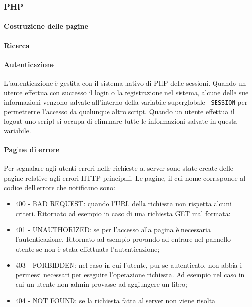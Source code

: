 \documentclass[12pt,a4paper,headings=optiontohead]{article}
\begin{document}
	\subsubsection{PHP}
	\paragraph{Costruzione delle pagine} %
	
	\paragraph{Ricerca} %
	
	\paragraph{Autenticazione}
	L'autenticazione è gestita con il sistema nativo di PHP delle sessioni. Quando un utente effettua con successo il login o la registrazione nel sistema, alcune delle sue informazioni vengono salvate all'interno della variabile superglobale \texttt{\_SESSION} per permetterne l'accesso da qualunque altro script. Quando un utente effettua il logout uno script si occupa di eliminare tutte le informazioni salvate in questa variabile. 
	
	\paragraph{Pagine di errore} %
	Per segnalare agli utenti errori nelle richieste al server sono state create delle pagine relative agli errori HTTP principali. Le pagine, il cui nome corrisponde al codice dell'errore che notificano sono:
	\begin{itemize}
		\item 400 - BAD REQUEST: quando l'URL della richiesta non rispetta alcuni criteri. Ritornato ad esempio in caso di una richiesta GET mal formata;
		\item 401 - UNAUTHORIZED: se per l'accesso alla pagina è necessaria l'autenticazione. Ritornato ad esempio provando ad entrare nel pannello utente se non è stata effettuata l'autenticazione;
		\item 403 - FORBIDDEN: nel caso in cui l'utente, pur se autenticato, non abbia i permessi necessari per eseguire l'operazione richiesta. Ad esempio nel caso in cui un utente non admin provasse ad aggiungere un libro;
		\item 404 - NOT FOUND: se la richiesta fatta al server non viene risolta.
	\end{itemize}
	
\end{document}
